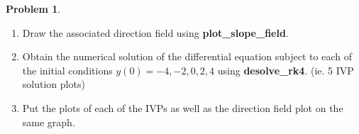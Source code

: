 \documentclass[10pt]{article}
\theoremstyle{definition}
\newtheorem{problem}{Problem}
\begin{document}
\begin{problem}
\begin{enumerate}[label=(\alph*)]
        \begin{enumerate}[label=\roman*.]
          \item Draw the associated direction field using \textbf{plot\_slope\_field}.
          \item Obtain the numerical solution of the differential equation subject to each of the initial
                conditions $y(0) = -4, -2, 0, 2, 4$ using \textbf{desolve\_rk4}. (ie. 5 IVP solution plots)
          \item Put the plots of each of the IVPs as well as the direction field plot on the same graph.
        \end{enumerate}
\end{enumerate}
\begin{center}

\end{center}
\end{problem}
\newpage
\end{document}
